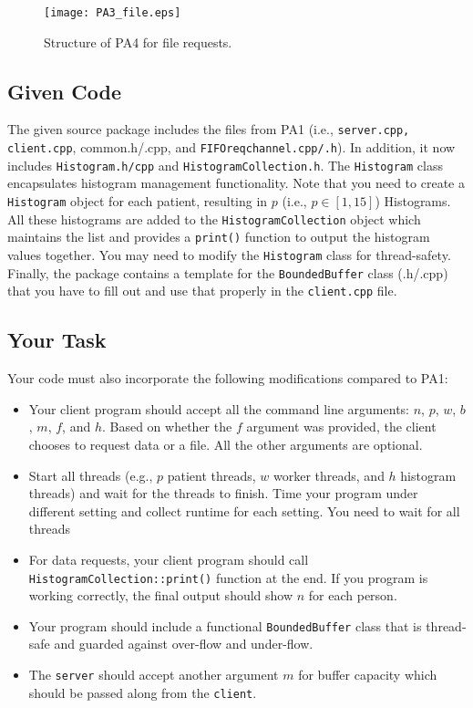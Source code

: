 \documentclass[12pt]{article}
\begin{document}
\begin{figure}[t]\centering
\texttt{[image: PA3\_file.eps]}
\caption{Structure of PA4 for file requests.}
\label{fig:PA3_file}
\end{figure}

\subsection*{Given Code}	
The given source package includes the files from PA1 (i.e., \texttt{server.cpp, client.cpp}, {common.h/.cpp}, and \texttt{FIFOreqchannel.cpp/.h}). In addition, it now includes \texttt{Histogram.h/cpp} and \texttt{HistogramCollection.h}. The \texttt{Histogram} class encapsulates histogram management functionality. Note that you need to create a \texttt{Histogram} object for each patient, resulting in $p$ (i.e., $p \in [1,15]$) Histograms. All these histograms are added to the \texttt{HistogramCollection} object which maintains the list and provides a \texttt{print()} function to output the histogram values together. You may need to modify the \texttt{Histogram} class for thread-safety. Finally, the package contains a template for the \texttt{BoundedBuffer} class (.h/.cpp) that you have to fill out and use that properly in the \texttt{client.cpp} file.  	

\subsection*{Your Task}
Your code must also incorporate the following modifications compared to PA1:
\begin{itemize}
	\item Your client program should accept all the command line arguments: $n$, $p$, $w$, $b$, $m$, $f$, and $h$. Based on whether the $f$ argument was provided, the client chooses to request data or a file. All the other arguments are optional.
	
	\item Start all threads (e.g., $p$ patient threads, $w$ worker threads, and $h$ histogram threads) and wait for the threads to finish. Time your program under different setting and collect runtime for each setting. You need to wait for all threads 
	
	\item For data requests, your client program should call \texttt{HistogramCollection::print()} function at the end. If you program is working correctly, the final output should show $n$ for each person.
	
	\item Your program should include a functional \texttt{BoundedBuffer} class that is thread-safe and guarded against over-flow and under-flow.
	
	\item The \texttt{server} should accept another argument $m$ for buffer capacity which should be passed along from the \texttt{client}.
\end{itemize}
\end{document}
